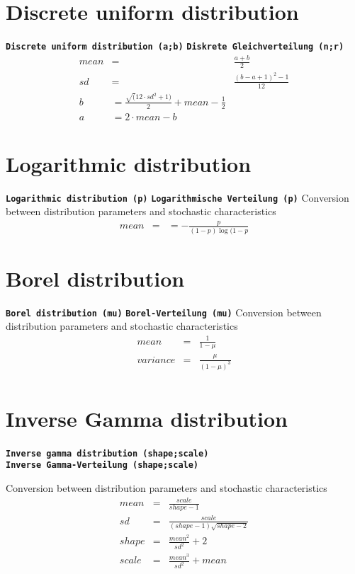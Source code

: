 \documentclass{svmono}
\def\cm#1{\textbf{\texttt{#1}}}
\begin{document}
\section*{Discrete uniform distribution}
\cm{Discrete uniform distribution (a;b)}
\cm{Diskrete Gleichverteilung (n;r)}
\begin{eqnarray*}
mean&=&\frac{a+b}{2}\\
sd&=&\frac{(b-a+1)^2-1}{12}\\
b&=\frac{\sqrt(12\cdot sd^2+1)}{2}+mean-\frac{1}{2}\\
a&=2\cdot mean-b&
\end{eqnarray*}





\section*{Logarithmic distribution}
\cm{Logarithmic distribution (p)}
\cm{Logarithmische Verteilung (p)}
Conversion between distribution parameters and stochastic characteristics
\begin{eqnarray*}
mean&=&=-\frac{p}{(1-p)\log(1-p}
\end{eqnarray*}





\section*{Borel distribution}
\cm{Borel distribution (mu)}
\cm{Borel-Verteilung (mu)}
Conversion between distribution parameters and stochastic characteristics
\begin{eqnarray*}
mean&=&\frac{1}{1-\mu}\\
variance&=&\frac{\mu}{(1-\mu)^3}\\
\end{eqnarray*}





\section*{Inverse Gamma distribution}
\cm{Inverse gamma distribution (shape;scale)}~\\
\cm{Inverse Gamma-Verteilung (shape;scale)}

Conversion between distribution parameters and stochastic characteristics
\begin{eqnarray*}
mean&=&\frac{scale}{shape-1}\\
sd&=&\frac{scale}{(shape-1)\sqrt{shape-2}}\\
shape&=&\frac{mean^2}{sd^2}+2\\
scale&=&\frac{mean^3}{sd^2}+mean
\end{eqnarray*}
\end{document}
